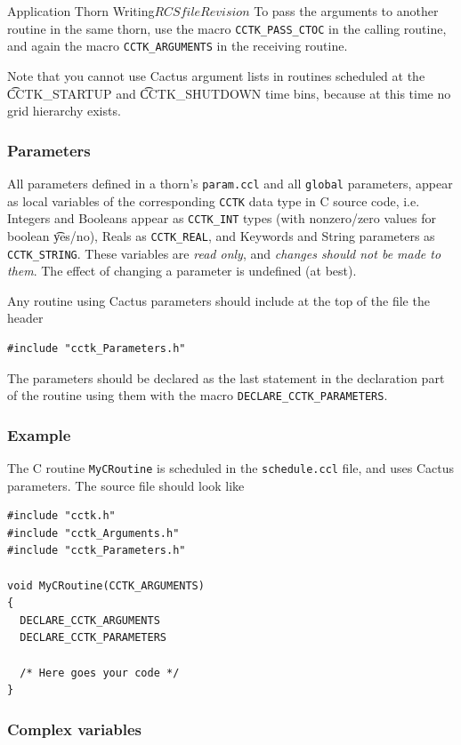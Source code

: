 \begin{cactuspart}{Application Thorn Writing}{$RCSfile$}{$Revision$}
To pass the arguments to another routine in the same thorn, use the macro
\texttt{CCTK\_PASS\_CTOC} in the calling routine, and again the macro
\texttt{CCTK\_ARGUMENTS} in the receiving routine.

Note that you cannot use Cactus argument lists in routines scheduled at the
{\t CCTK\_STARTUP} and {\t CCTK\_SHUTDOWN} time bins, because at this time
no grid hierarchy exists.


\subsubsection{Parameters}

All parameters defined in a thorn's \texttt{param.ccl} and all \texttt{global}
parameters, appear as local variables of the corresponding \texttt{CCTK} data type
in C source code, i.e. Integers and Booleans appear as \texttt{CCTK\_INT} types
(with nonzero/zero values for boolean {\t yes/no}), Reals as
\texttt{CCTK\_REAL}, and Keywords and String parameters as \texttt{CCTK\_STRING}.
These variables are \emph{read only}, and \emph{changes should not be made to
them}.  The effect of changing a parameter is undefined (at best).

Any routine using Cactus parameters should include at
the top of the file the header
\begin{verbatim}
#include "cctk_Parameters.h"
\end{verbatim}

The parameters should be declared as the last statement in the declaration part
of the routine using them with the macro \texttt{DECLARE\_CCTK\_PARAMETERS}.

\subsubsection{Example}

The C routine \verb|MyCRoutine| is scheduled in the \texttt{schedule.ccl} file,
and uses Cactus parameters. The source file should look like
\begin{verbatim}
#include "cctk.h"
#include "cctk_Arguments.h"
#include "cctk_Parameters.h"

void MyCRoutine(CCTK_ARGUMENTS)
{
  DECLARE_CCTK_ARGUMENTS
  DECLARE_CCTK_PARAMETERS

  /* Here goes your code */
}
\end{verbatim}

\subsubsection{Complex variables}


\end{cactuspart}
